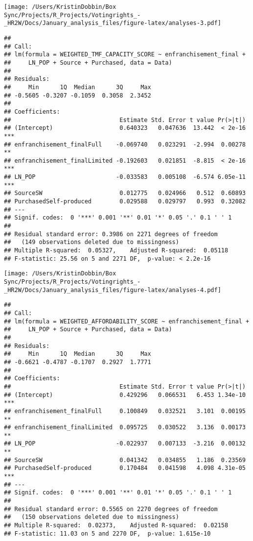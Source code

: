 \documentclass[
]{article}
\begin{document}
\texttt{[image: /Users/KristinDobbin/Box Sync/Projects/R\_Projects/Votingrights\_-\_HR2W/Docs/January\_analysis\_files/figure-latex/analyses-3.pdf]}

\begin{verbatim}
## 
## Call:
## lm(formula = WEIGHTED_TMF_CAPACITY_SCORE ~ enfranchisement_final + 
##     LN_POP + Source + Purchased, data = Data)
## 
## Residuals:
##     Min      1Q  Median      3Q     Max 
## -0.5605 -0.3207 -0.1059  0.3058  2.3452 
## 
## Coefficients:
##                               Estimate Std. Error t value Pr(>|t|)    
## (Intercept)                   0.640323   0.047636  13.442  < 2e-16 ***
## enfranchisement_finalFull    -0.069740   0.023291  -2.994  0.00278 ** 
## enfranchisement_finalLimited -0.192603   0.021851  -8.815  < 2e-16 ***
## LN_POP                       -0.033583   0.005108  -6.574 6.05e-11 ***
## SourceSW                      0.012775   0.024966   0.512  0.60893    
## PurchasedSelf-produced        0.029588   0.029797   0.993  0.32082    
## ---
## Signif. codes:  0 '***' 0.001 '**' 0.01 '*' 0.05 '.' 0.1 ' ' 1
## 
## Residual standard error: 0.3986 on 2271 degrees of freedom
##   (149 observations deleted due to missingness)
## Multiple R-squared:  0.05327,    Adjusted R-squared:  0.05118 
## F-statistic: 25.56 on 5 and 2271 DF,  p-value: < 2.2e-16
\end{verbatim}

\texttt{[image: /Users/KristinDobbin/Box Sync/Projects/R\_Projects/Votingrights\_-\_HR2W/Docs/January\_analysis\_files/figure-latex/analyses-4.pdf]}

\begin{verbatim}
## 
## Call:
## lm(formula = WEIGHTED_AFFORDABILITY_SCORE ~ enfranchisement_final + 
##     LN_POP + Source + Purchased, data = Data)
## 
## Residuals:
##     Min      1Q  Median      3Q     Max 
## -0.6621 -0.4787 -0.1707  0.2927  1.7771 
## 
## Coefficients:
##                               Estimate Std. Error t value Pr(>|t|)    
## (Intercept)                   0.429296   0.066531   6.453 1.34e-10 ***
## enfranchisement_finalFull     0.100849   0.032521   3.101  0.00195 ** 
## enfranchisement_finalLimited  0.095725   0.030522   3.136  0.00173 ** 
## LN_POP                       -0.022937   0.007133  -3.216  0.00132 ** 
## SourceSW                      0.041342   0.034855   1.186  0.23569    
## PurchasedSelf-produced        0.170484   0.041598   4.098 4.31e-05 ***
## ---
## Signif. codes:  0 '***' 0.001 '**' 0.01 '*' 0.05 '.' 0.1 ' ' 1
## 
## Residual standard error: 0.5565 on 2270 degrees of freedom
##   (150 observations deleted due to missingness)
## Multiple R-squared:  0.02373,    Adjusted R-squared:  0.02158 
## F-statistic: 11.03 on 5 and 2270 DF,  p-value: 1.615e-10
\end{verbatim}
\end{document}
